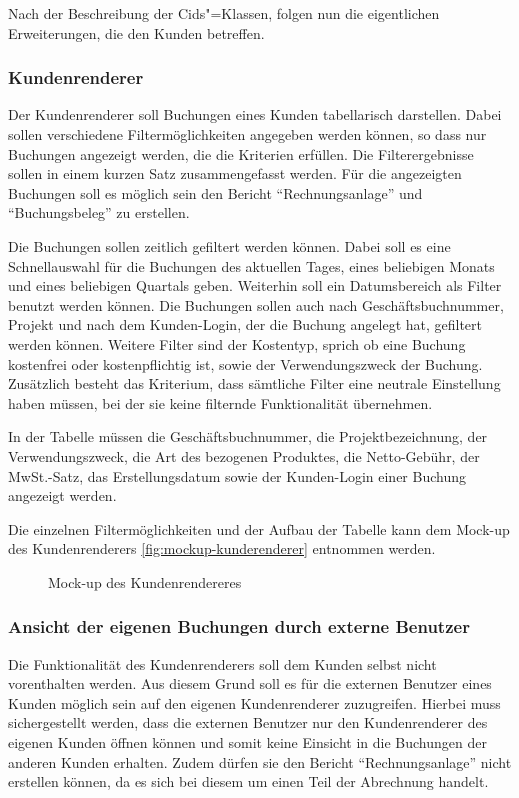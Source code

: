 Nach der Beschreibung der Cids"=Klassen, folgen nun die eigentlichen Erweiterungen, die den Kunden betreffen.

\subsubsection{Kundenrenderer} \label{subsubsec:kundenrenderer}
Der Kundenrenderer soll Buchungen eines Kunden tabellarisch darstellen.
Dabei sollen verschiedene Filtermöglichkeiten angegeben werden können, so dass nur Buchungen angezeigt werden, die die Kriterien erfüllen.
Die Filterergebnisse sollen in einem kurzen Satz zusammengefasst werden.
Für die angezeigten Buchungen soll es möglich sein den Bericht \enquote{Rechnungsanlage} und \enquote{Buchungsbeleg} zu erstellen.

Die Buchungen sollen zeitlich gefiltert werden können.
Dabei soll es eine Schnellauswahl für die Buchungen des aktuellen Tages, eines beliebigen Monats und eines beliebigen Quartals geben.
Weiterhin soll ein Datumsbereich als Filter benutzt werden können.
Die Buchungen sollen auch nach Geschäftsbuchnummer, Projekt und nach dem Kunden-Login, der die Buchung angelegt hat, gefiltert werden können.
Weitere Filter sind der Kostentyp, sprich ob eine Buchung kostenfrei oder kostenpflichtig ist, sowie der Verwendungszweck der Buchung.
Zusätzlich besteht das Kriterium, dass sämtliche Filter eine neutrale Einstellung haben müssen, bei der sie keine filternde Funktionalität übernehmen.

In der Tabelle müssen die Geschäftsbuchnummer, die Projektbezeichnung, der Verwendungszweck, die Art des bezogenen Produktes, die Netto-Gebühr, der MwSt.-Satz, das Erstellungsdatum sowie der Kunden-Login einer Buchung angezeigt werden.

Die einzelnen Filtermöglichkeiten und der Aufbau der Tabelle kann dem Mock-up des Kundenrenderers \vref{fig:mockup-kunderenderer} entnommen werden.

\begin{figure}[htb]
	\centering
	\caption{Mock-up des Kundenrendereres}
	\label{fig:mockup-kunderenderer}
\end{figure}

\subsubsection{Ansicht der eigenen Buchungen durch externe Benutzer} \label{subsubsec:ansicht_externe_benutzer}
Die Funktionalität des Kundenrenderers soll dem Kunden selbst nicht vorenthalten werden.
Aus diesem Grund soll es für die externen Benutzer eines Kunden möglich sein auf den eigenen Kundenrenderer zuzugreifen.
Hierbei muss sichergestellt werden, dass die externen Benutzer nur den Kundenrenderer des eigenen Kunden öffnen können und somit keine Einsicht in die Buchungen der anderen Kunden erhalten. 
Zudem dürfen sie den Bericht \enquote{Rechnungsanlage} nicht erstellen können, da es sich bei diesem um einen Teil der Abrechnung handelt.

